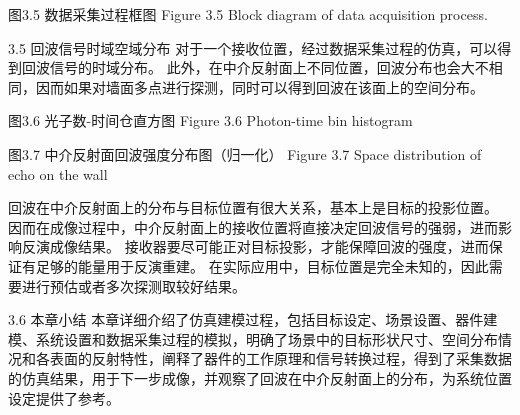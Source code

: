  
图3.5  数据采集过程框图
Figure 3.5 Block diagram of data acquisition process.

3.5  回波信号时域空域分布
对于一个接收位置，经过数据采集过程的仿真，可以得到回波信号的时域分布。
此外，在中介反射面上不同位置，回波分布也会大不相同，因而如果对墙面多点进行探测，同时可以得到回波在该面上的空间分布。


 
图3.6  光子数-时间仓直方图
Figure 3.6 Photon-time bin histogram

 
图3.7  中介反射面回波强度分布图（归一化）
Figure 3.7 Space distribution of echo on the wall

回波在中介反射面上的分布与目标位置有很大关系，基本上是目标的投影位置。
因而在成像过程中，中介反射面上的接收位置将直接决定回波信号的强弱，进而影响反演成像结果。
接收器要尽可能正对目标投影，才能保障回波的强度，进而保证有足够的能量用于反演重建。
在实际应用中，目标位置是完全未知的，因此需要进行预估或者多次探测取较好结果。

3.6  本章小结
本章详细介绍了仿真建模过程，包括目标设定、场景设置、器件建模、系统设置和数据采集过程的模拟，明确了场景中的目标形状尺寸、空间分布情况和各表面的反射特性，阐释了器件的工作原理和信号转换过程，得到了采集数据的仿真结果，用于下一步成像，并观察了回波在中介反射面上的分布，为系统位置设定提供了参考。

